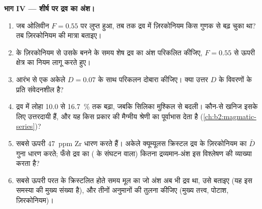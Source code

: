 \begin{problem}
\noindent\textbf{भाग IV --- शीर्ष पर द्रव का अंश।}
\begin{enumerate}[resume]
\item जब ओलिवीन $F = 0.55$ पर लुप्त हुआ, तब तक द्रव में ज़िरकोनियम किस गुणक से
बढ़ चुका था? तब ज़िरकोनियम की मात्रा बताइए।
\item {} के ज़िरकोनियम से उसके बनने के समय शेष द्रव का अंश परिकलित कीजिए,
$F = 0.55$ से ऊपरी क्षेत्र का नियम लागू करते हुए।
\item आरंभ से एक अकेले $D = 0.07$ के साथ परिकलन दोबारा कीजिए। क्या उत्तर
$D$ के विवरणों के प्रति संवेदनशील है?
\item द्रव में लोहा 10.0 से \qty{16.7}{\percent} तक बढ़ा, जबकि सिलिका मुश्किल से
बदली। कौन-से खनिज इसके लिए उत्तरदायी हैं, और यह किस प्रकार की मैग्मीय श्रेणी का
पूर्वाभास देता है (\cref{ch:b2:magmatic-series})?
\item सबसे ऊपरी  \qty{47}{ppm} Zr धारण करते हैं। अकेले क्यूम्यूलस क्रिस्टल
द्रव के ज़िरकोनियम का $\bar D$ गुना धारण करते; फँसे द्रव का ( के संघटन वाला) कितना
द्रव्यमान-अंश इस विश्लेषण की व्याख्या करता है?
\item सबसे ऊपरी परत के क्रिस्टलित होते समय मूल  का जो अंश अब भी द्रव था, उसे बताइए
(यह इस समस्या की मुख्य संख्या है), और तीनों अनुमानों की तुलना कीजिए
(मुख्य तत्त्व, पोटाश, ज़िरकोनियम)।
\end{enumerate}
\end{problem}
